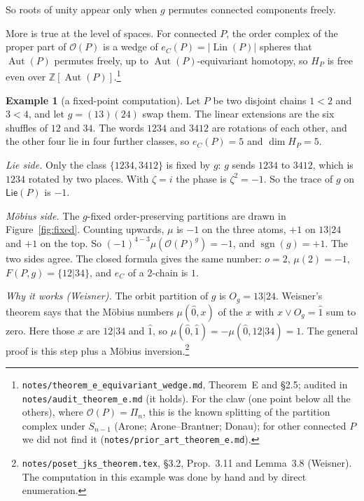 \documentclass[11pt]{article}
\theoremstyle{definition}
\newtheorem{example}{Example}
\theoremstyle{remark}
\newcommand{\OP}{\mathcal O}
\newcommand{\Lin}{\operatorname{Lin}}
\newcommand{\Aut}{\operatorname{Aut}}
\newcommand{\PLie}{\mathsf{Lie}}
\newcommand{\sgn}{\operatorname{sgn}}
\newcommand{\src}[1]{\nolinkurl{#1}}
\newcommand{\tagbox}[1]{\leavevmode\marginpar{\raggedright\fbox{\parbox{0.66in}{\centering\scriptsize\sffamily #1}}}}
\newcommand{\PROVEN}{\tagbox{PROVEN\\AUDITED}}
\begin{document}
So roots of unity appear only when $g$ permutes connected components freely.

More is true at the level of spaces. For connected $P$, the order complex of
the proper part of $\OP(P)$ is a wedge of $e_C(P)=|\Lin(P)|$ spheres that $\Aut(P)$
permutes freely, up to $\Aut(P)$-equivariant homotopy, so $H_P$ is free even
over $\mathbb Z[\Aut(P)]$.\footnote{%
\src{notes/theorem_e_equivariant_wedge.md}, Theorem~E and \S2.5; audited in
\src{notes/audit_theorem_e.md} (it holds). For the claw (one point below all
the others), where $\OP(P)=\Pi_n$, this is the known splitting of the
partition complex under $S_{n-1}$ (Arone; Arone--Brantner; Donau); for other
connected $P$ we did not find it (\src{notes/prior_art_theorem_e.md}).}\PROVEN

\begin{example}[a fixed-point computation]\label{ex:fixed}
Let $P$ be two disjoint chains $1<2$ and $3<4$, and let $g=(13)(24)$ swap
them. The linear extensions are the six shuffles of $12$ and $34$. The words
$1234$ and $3412$ are rotations of each other, and the other four lie in four
further classes, so $e_C(P)=5$ and $\dim H_P=5$.

\emph{Lie side.} Only the class $\{1234,3412\}$ is fixed by $g$: $g$ sends
$1234$ to $3412$, which is $1234$ rotated by two places. With $\zeta=i$ the
phase is $\zeta^2=-1$. So the trace of $g$ on $\PLie(P)$ is $-1$.

\emph{M\"obius side.} The $g$-fixed order-preserving partitions are drawn in
Figure~\ref{fig:fixed}. Counting upwards, $\mu$ is $-1$ on the three atoms,
$+1$ on $13|24$ and $+1$ on the top. So $(-1)^{4-3}\mu(\OP(P)^g)=-1$, and
$\sgn(g)=+1$. The two sides agree. The closed formula gives the same number:
$o=2$, $\mu(2)=-1$, $F(P,g)=\{12|34\}$, and $e_C$ of a $2$-chain is $1$.

\emph{Why it works (Weisner).} The orbit partition of $g$ is
$O_g=13|24$. Weisner's theorem says that the M\"obius numbers $\mu(\hat0,x)$
of the $x$ with $x\vee O_g=\hat1$ sum to zero. Here those $x$ are $12|34$ and
$\hat1$, so $\mu(\hat0,\hat1)=-\mu(\hat0,12|34)=1$. The general proof is this
step plus a M\"obius inversion.\footnote{\src{notes/poset_jks_theorem.tex},
\S3.2, Prop.~3.11 and Lemma~3.8 (Weisner). The computation in this example was done by
hand and by direct enumeration.}
\end{example}
\end{document}
